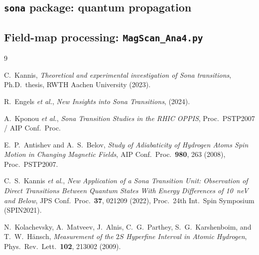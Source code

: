 \documentclass[11pt,a4paper]{article}
\begin{document}
\subsection*{\texttt{sona} package: quantum propagation}






\subsection*{Field-map processing: \texttt{MagScan\_Ana4.py}}



\begin{thebibliography}{9}

C.~Kannis,
\emph{Theoretical and experimental investigation of Sona transitions},
Ph.D.\ thesis, RWTH Aachen University (2023).

R.~Engels \emph{et al.},
\emph{New Insights into Sona Transitions}, (2024).

A.~Kponou \emph{et al.},
\emph{Sona Transition Studies in the RHIC OPPIS}, Proc.\ PSTP2007 / AIP Conf.\ Proc.

E.~P.~Antishev and A.~S.~Belov,
\emph{Study of Adiabaticity of Hydrogen Atoms Spin Motion in Changing
Magnetic Fields}, AIP Conf.\ Proc.\ \textbf{980}, 263 (2008),
Proc.\ PSTP2007.

C.~S.~Kannis \emph{et al.},
\emph{New Application of a Sona Transition Unit: Observation of Direct
Transitions Between Quantum States With Energy Differences of 10~neV and
Below}, JPS Conf.\ Proc.\ \textbf{37}, 021209 (2022),
Proc.\ 24th Int.\ Spin Symposium (SPIN2021).

N.~Kolachevsky, A.~Matveev, J.~Alnis, C.~G.~Parthey, S.~G.~Karshenboim,
and T.~W.~H\"ansch,
\emph{Measurement of the $2S$ Hyperfine Interval in Atomic Hydrogen},
Phys.\ Rev.\ Lett.\ \textbf{102}, 213002 (2009).

\end{thebibliography}
\end{document}
